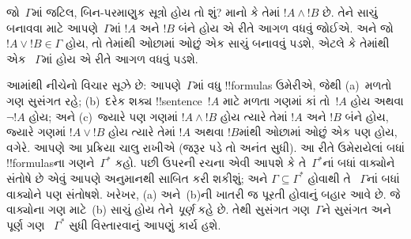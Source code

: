 \documentclass[../../../include/open-logic-section]{subfiles}
\begin{document}
જો~$\Gamma$માં જટિલ, બિન-પરમાણુક સૂત્રો હોય તો શું? માનો કે તેમાં
$!A \land !B$ છે. તેને સાચું બનાવવા માટે આપણે~$\Gamma$માં $!A$ અને
$!B$ બંને હોય એ રીતે આગળ વધવું જોઈએ. અને જો $!A \lor !B \in \Gamma$
હોય, તો તેમાંથી ઓછામાં ઓછું એક સાચું બનાવવું પડશે, એટલે કે તેમાંથી એક
~$\Gamma$માં હોય એ રીતે આગળ વધવું પડશે.

આમાંથી નીચેનો વિચાર સૂઝે છે: આપણે~$\Gamma$માં વધુ !!{formula}s ઉમેરીએ,
જેથી (a)~મળતો ગણ સુસંગત રહે; (b)~દરેક શક્ય !!{sentence}~$!A$ માટે
મળતા ગણમાં કાં તો~$!A$ હોય અથવા $\lnot !A$ હોય; અને (c)~જ્યારે પણ
ગણમાં $!A \land !B$ હોય ત્યારે તેમાં $!A$ અને $!B$ બંને હોય, જ્યારે
ગણમાં $!A \lor !B$ હોય ત્યારે તેમાં $!A$ અથવા $!B$માંથી ઓછામાં ઓછું એક
પણ હોય, વગેરે. આપણે આ પ્રક્રિયા ચાલુ રાખીએ (જરૂર પડે તો અનંત સુધી).
આ રીતે ઉમેરાયેલાં બધાં !!{formula}sના ગણને~$\Gamma^*$ કહો. પછી ઉપરની
રચના એવી 
આપશે કે તે~$\Gamma^*$નાં બધાં વાક્યોને સંતોષે છે એવું આપણે અનુમાનથી
સાબિત કરી શકીશું; અને $\Gamma \subseteq \Gamma^*$ હોવાથી તે
~$\Gamma$નાં બધાં વાક્યોને પણ સંતોષશે. ખરેખર, (a) અને~(b)ની ખાતરી જ
પૂરતી હોવાનું બહાર આવે છે. જે વાક્યોના ગણ માટે~(b) સાચું હોય તેને
\emph{પૂર્ણ} કહે છે. તેથી સુસંગત ગણ~$\Gamma$ને સુસંગત અને પૂર્ણ ગણ
~$\Gamma^*$ સુધી વિસ્તારવાનું આપણું કાર્ય હશે.
\end{document}

